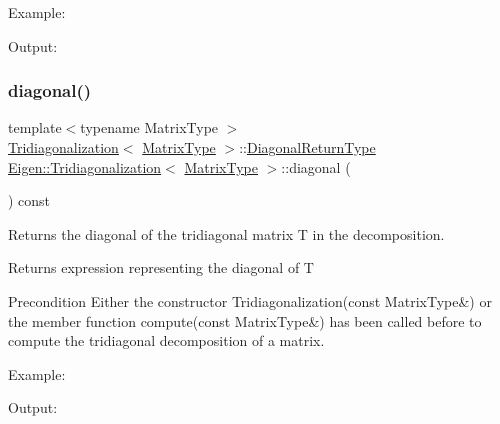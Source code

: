 Example\+: 
\begin{DoxyCodeInclude}{0}
\end{DoxyCodeInclude}
 Output\+: 
\begin{DoxyVerbInclude}
\end{DoxyVerbInclude}
 \mbox{\label{class_eigen_1_1_tridiagonalization_a0b7ff4860aa6f7c0761b1059c012fd8e}} 
\subsubsection{\texorpdfstring{diagonal()}{diagonal()}}
{\footnotesize\ttfamily template$<$typename Matrix\+Type $>$ \\
\mbox{\hyperlink{class_eigen_1_1_tridiagonalization}{Tridiagonalization}}$<$ \mbox{\hyperlink{class_eigen_1_1_tridiagonalization_add0f4b2216d0ea8ee0f7d8525deaf0a9}{Matrix\+Type}} $>$\+::\mbox{\hyperlink{struct_eigen_1_1internal_1_1true__type}{Diagonal\+Return\+Type}} \mbox{\hyperlink{class_eigen_1_1_tridiagonalization}{Eigen\+::\+Tridiagonalization}}$<$ \mbox{\hyperlink{class_eigen_1_1_tridiagonalization_add0f4b2216d0ea8ee0f7d8525deaf0a9}{Matrix\+Type}} $>$\+::diagonal (\begin{DoxyParamCaption}{ }\end{DoxyParamCaption}) const}



Returns the diagonal of the tridiagonal matrix T in the decomposition. 

\begin{DoxyReturn}{Returns}
expression representing the diagonal of T
\end{DoxyReturn}
\begin{DoxyPrecond}{Precondition}
Either the constructor Tridiagonalization(const Matrix\+Type\&) or the member function compute(const Matrix\+Type\&) has been called before to compute the tridiagonal decomposition of a matrix.
\end{DoxyPrecond}
Example\+: 
\begin{DoxyCodeInclude}{0}
\end{DoxyCodeInclude}
 Output\+: 
\begin{DoxyVerbInclude}
\end{DoxyVerbInclude}


